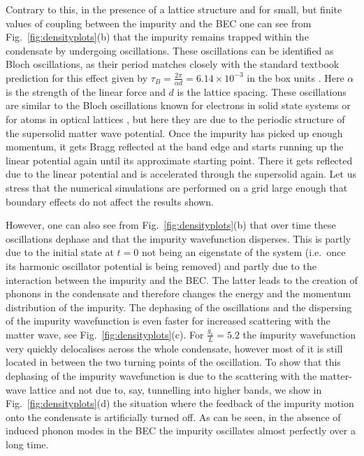 \documentclass[12pt]{iopart}
\begin{document}
Contrary to this, in the presence of a lattice structure and for small, but finite values of coupling between the impurity and the BEC one can see from Fig.~\ref{fig:densityplots}(b) that the impurity remains trapped within the condensate by undergoing oscillations. These oscillations can be identified as Bloch oscillations, as their period matches closely with the standard textbook prediction for this effect given by  $\tau_B = \frac{2\pi}{\alpha d} = 6.14\times10^{-3}$ in the box units \cite{Kittel:2004}. Here $\alpha$ is the strength of the linear force and $d$ is the lattice spacing. These oscillations are similar to the Bloch oscillations known for electrons in solid state systems \cite{Ashcroft76,Hartmann_2004} or for atoms in optical lattices \cite{arimondo:2001,oberthaler_2006,Anderson:1998,Kessler:2016,prasanna:2009}, but here they are due to the periodic structure of the supersolid matter wave potential. Once the impurity has picked up enough momentum, it gets Bragg reflected at the band edge and starts running up the linear potential again until its approximate starting point. There it gets reflected due to the linear potential and is accelerated through the supersolid again. Let us stress that the numerical simulations are performed on a grid large enough  that boundary effects do not affect the results shown.

However, one can also see from Fig.~\ref{fig:densityplots}(b) that over time these oscillations dephase and that the impurity wavefunction disperses. This is partly due to the initial state at $t=0$ not being an eigenstate of the system (i.e.~once its harmonic oscillator potential is being removed) and partly due to the interaction between the impurity and the BEC. The latter leads to the creation of phonons in the condensate and therefore changes the energy and the momentum distribution of the impurity.  The dephasing of the oscillations and the dispersing of the impurity wavefunction is even faster for increased scattering with the matter wave, see Fig.~\ref{fig:densityplots}(c). For $\frac{g_c}{L}=5.2$ the impurity wavefunction very quickly delocalises across the whole condensate, however most of it is still located in between the two turning points of the oscillation. To show that this dephasing of the impurity wavefunction is due to the scattering with the matter-wave lattice and not due to, say, tunnelling into higher bands, we show in Fig.~\ref{fig:densityplots}(d) the situation where the feedback of the impurity motion onto the condensate is artificially turned off.  As can be seen, in the absence of induced phonon modes in the BEC the impurity oscillates almost perfectly over a long time.
\end{document}
